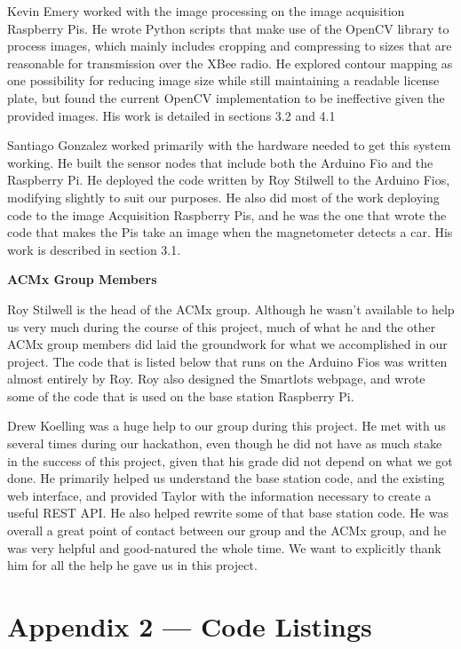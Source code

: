 \documentclass[11pt, oneside, fullpage, doublespace]{article}
\begin{document}
Kevin Emery worked with the image processing on the image acquisition Raspberry Pis. He wrote Python scripts that make use of the OpenCV library to process images, which mainly includes cropping and compressing to sizes that are reasonable for transmission over the XBee radio. He explored contour mapping as one possibility for reducing image size while still maintaining a readable license plate, but found the current OpenCV implementation to be ineffective given the provided images. His work is detailed in sections 3.2 and 4.1

Santiago Gonzalez worked primarily with the hardware needed to get this system working. He built the sensor nodes that include both the Arduino Fio and the Raspberry Pi. He deployed the code written by Roy Stilwell to the Arduino Fios, modifying slightly to suit our purposes. He also did most of the work deploying code to the image Acquisition Raspberry Pis, and he was the one that wrote the code that makes the Pis take an image when the magnetometer detects a car. His work is described in section 3.1.

\textbf{ACMx Group Members}

Roy Stilwell is the head of the ACMx group. Although he wasn't available to help us very much during the course of this project, much of what he and the other ACMx group members did laid the groundwork for what we accomplished in our project. The code that is listed below that runs on the Arduino Fios was written almost entirely by Roy. Roy also designed the Smartlots webpage, and wrote some of the code that is used on the base station Raspberry Pi.

Drew Koelling was a huge help to our group during this project. He met with us several times during our hackathon, even though he did not have as much stake in the success of this project, given that his grade did not depend on what we got done. He primarily helped us understand the base station code, and the existing web interface, and provided Taylor with the information necessary to create a useful REST API. He also helped rewrite some of that base station code. He was overall a great point of contact between our group and the ACMx group, and he was very helpful and good-natured the whole time. We want to explicitly thank him for all the help he gave us in this project.

\section*{Appendix 2 --- Code Listings}
\end{document}
